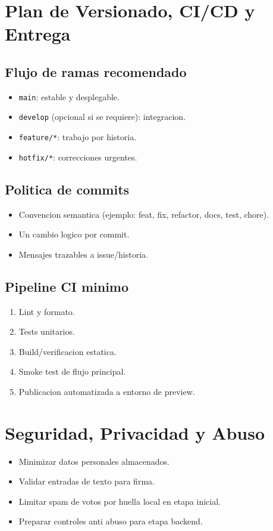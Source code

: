 \documentclass[12pt,a4paper]{article}
\begin{document}
\section{Plan de Versionado, CI/CD y Entrega}
\subsection{Flujo de ramas recomendado}
\begin{itemize}
  \item \texttt{main}: estable y desplegable.
  \item \texttt{develop} (opcional si se requiere): integracion.
  \item \texttt{feature/*}: trabajo por historia.
  \item \texttt{hotfix/*}: correcciones urgentes.
\end{itemize}

\subsection{Politica de commits}
\begin{itemize}
  \item Convencion semantica (ejemplo: feat, fix, refactor, docs, test, chore).
  \item Un cambio logico por commit.
  \item Mensajes trazables a issue/historia.
\end{itemize}

\subsection{Pipeline CI minimo}
\begin{enumerate}
  \item Lint y formato.
  \item Tests unitarios.
  \item Build/verificacion estatica.
  \item Smoke test de flujo principal.
  \item Publicacion automatizada a entorno de preview.
\end{enumerate}

\section{Seguridad, Privacidad y Abuso}
\begin{itemize}
  \item Minimizar datos personales almacenados.
  \item Validar entradas de texto para firma.
  \item Limitar spam de votos por huella local en etapa inicial.
  \item Preparar controles anti abuso para etapa backend.
\end{itemize}
\end{document}
